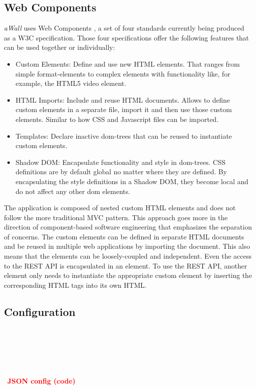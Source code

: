 \documentclass{sigchi}
\newcommand\todo[1]{\\~\\~\\~\\~\\~\textbf{\huge{\textcolor{red}{#1}}}\\~\\~\\~\\~\\~}
\begin{document}
\subsection{Web Components}
\textit{aWall} uses Web Components \cite{webcomponents.org}, a set of four standards currently being produced as a W3C specification.
Those four specifications offer the following features that can be used together or individually:
\begin{itemize}
	\item Custom Elements: Define and use new HTML elements. 
	That ranges from simple format-elements to complex elements with functionality like, for example, the HTML5 video element.
	\item HTML Imports: Include and reuse HTML documents.
	Allows to define custom elements in a separate file,  import it and then use those custom elements. 
	Similar to how CSS and Javascript files can be imported.
	\item Templates: Declare inactive \gls{dom}-trees that can be reused to instantiate custom elements.
	\item Shadow DOM: Encapsulate functionality and style in \gls{dom}-trees.
	CSS definitions are by default global no matter where they are defined.
	By encapsulating the style definitions in a Shadow DOM, they become local and do not affect any other \gls{dom} elements.
\end{itemize}

The application is composed of nested custom HTML elements and does not follow the more traditional MVC pattern. 
This approach goes more in the direction of component-based software engineering that emphasizes the separation of concerns.
The custom elements can be defined in separate HTML documents and be reused in multiple web applications by importing the document.
This also means that the elements can be loosely-coupled and independent.
Even the access to the REST API is encapsulated in an element. 
To use the REST API, another element only needs to instantiate the appropriate custom element by inserting the corresponding HTML tags into its own HTML.


\subsection{Configuration}

\todo{JSON config (code)}
\end{document}
